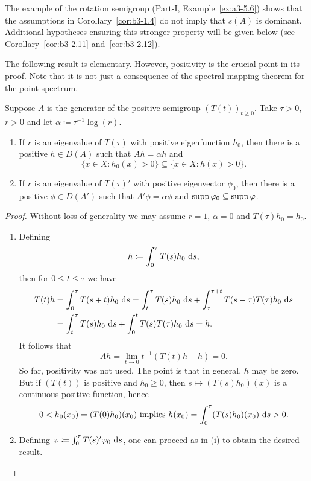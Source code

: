 The example of the rotation semigroup (Part-I, Example~\ref{ex:a3-5.6}) shows that the assumptions in Corollary~\ref{cor:b3-1.4} do not imply that $s(A)$ is dominant.
Additional hypotheses ensuring this stronger property will be given below (see Corollary~\ref{cor:b3-2.11} and~\ref{cor:b3-2.12}).

The following result is elementary. 
However, positivity is the crucial point in its proof. 	
Note that it is not just a consequence of the spectral mapping theorem for the point spectrum.
\begin{proposition}\label{prop:b3-1.5}
Suppose $A$ is the generator of the positive semigroup $(T(t))_{t \geq 0}$.
Take $\tau > 0$, $r > 0$ and let $\alpha \coloneq \tau^{-1}\log(r)$.
\begin{enumerate}[\upshape (i)]
\item 
If\/ $r$ is an eigenvalue of\/ $T(\tau)$ with positive eigenfunction
$h_{0}$, then there is a positive $h \in D(A)$ such that $Ah = \alpha h$ and 
\[
\{x \in X \colon h_{0}(x) > 0\} \subseteq \{x \in X \colon h(x) > 0\} .
\]
		
\item 
If\/ $r$ is an eigenvalue of\/ $T(\tau)'$ with positive eigenvector $\phi_{0}$, then there is a positive $\phi \in D(A')$ such that $A'\phi = \alpha\phi$ and $\supp\phi_{0} \subseteq \supp\phi$.
	\end{enumerate}
\end{proposition}
\begin{proof}
	Without loss of generality we may assume $r = 1$, \ie $\alpha = 0$ and $T(\tau)h_{0} = h_{0}$.
	\begin{enumerate}[\upshape (i), wide, labelindent=.25em]
    \item 
	Defining
	\begin{equation}\label{eq:b3-1.14}
		h \coloneq \int_{0}^{\tau} T(s)h_{0} \, \mathop{}\!\mathrm{d}{s}  , 
	\end{equation}
	then for $0 \leq t \leq \tau$ we have
	\begin{align*}
		T(t)h &= \int_{0}^{\tau} T(s+t)h_{0} \, \mathop{}\!\mathrm{d}{s}  = \int_{t}^{\tau} T(s)h_{0} \, \mathop{}\!\mathrm{d}{s}  + \int_{\tau}^{\tau+t} T(s-\tau)T(\tau)h_{0} \, \mathop{}\!\mathrm{d}{s}  \\
		&= \int_{t}^{\tau} T(s)h_{0} \, \mathop{}\!\mathrm{d}{s}  + \int_{0}^{t} T(s)T(\tau)h_{0} \, \mathop{}\!\mathrm{d}{s}  = h .
	\end{align*}
	It follows that 
    \[
    Ah = \lim_{t \to 0} t^{-1}(T(t)h - h) = 0 .
    \]
	So far, positivity was not used. 
    The point is that in general, $h$ may be zero.
	But if\/ $(T(t))$ is positive and $h_{0} \geq 0$, then $s \mapsto (T(s)h_{0})(x)$ is a continuous positive function, hence 
    \[
    0 < h_{0}(x_{0}) = (T(0)h_{0})(x_{0}) \text{ implies } h(x_{0}) = \int_{0}^{\tau} (T(s)h_{0})(x_{0}) \, \mathop{}\!\mathrm{d}{s}  > 0 .
    \]
	\item 
	Defining $\phi \coloneq \int_{0}^{\tau} T(s)'\phi_{0} \, \ds $, one can proceed as in (i) to obtain the desired result.
	\qedhere
	\end{enumerate}
\end{proof}
